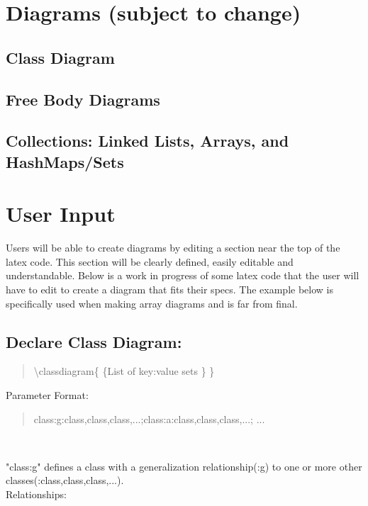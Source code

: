 \documentclass[10pt,a4paper,english]{article}
\begin{document}
\newpage
{}
\thispagestyle{fancy}
\begin{flushleft}
\section*{Diagrams \small{(subject to change)}}
\subsection*{Class Diagram}
\subsection*{Free Body Diagrams}
\subsection*{Collections: Linked Lists, Arrays, and HashMaps/Sets }

\section{User Input}
Users will be able to create diagrams by editing a section near the top of the latex code.  This section will be clearly defined, easily editable and understandable.  Below is a work in progress of some latex code that the user will have to edit to create a diagram that fits their specs. The example below is specifically used when making array diagrams and is far from final.


\subsection*{Declare Class Diagram:}
\begin{quote}{\ttfamily \raggedright \noindent

{\textbackslash}classdiagram{\{} {\{}List of key:value sets {\}} {\}} ~\\

}\end{quote}

Parameter Format:~\\ \medskip
\begin{quote}{\ttfamily \raggedright \noindent
{ {class:g:class,class,class,...};{class:a:class,class,class,...}; ...}
}\end{quote}

~\\ \medskip

"class:g" defines a class with a generalization relationship(:g) to one or more other classes(:class,class,class,...). 
~\\ \medskip
Relationships: ~\\ \medskip


\end{flushleft}
\end{document}
